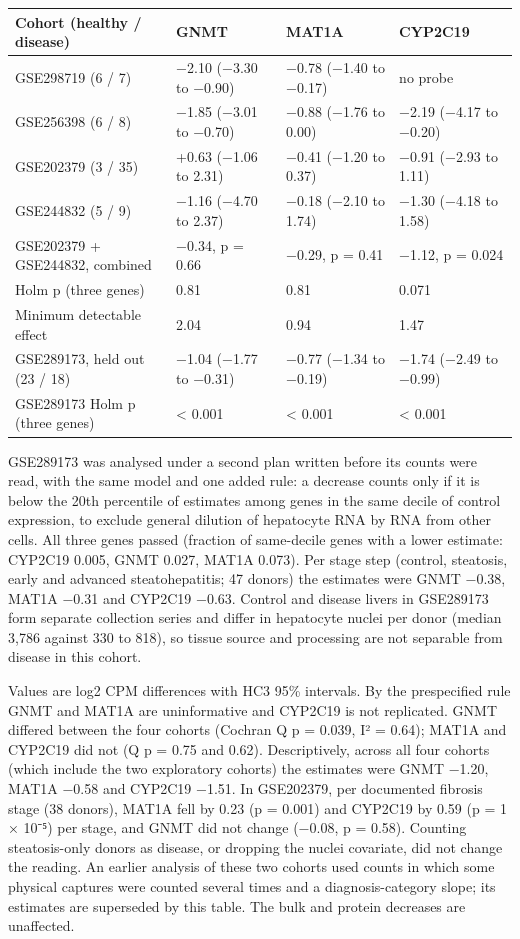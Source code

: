 \begin{longtable}[]{@{}llll@{}}
\toprule\noalign{}
Cohort (healthy / disease) & GNMT & MAT1A & CYP2C19 \\
\midrule\noalign{}
\endhead
\bottomrule\noalign{}
\endlastfoot
GSE298719 (6 / 7) & −2.10 (−3.30 to −0.90) & −0.78 (−1.40 to −0.17) & no probe \\
GSE256398 (6 / 8) & −1.85 (−3.01 to −0.70) & −0.88 (−1.76 to 0.00) & −2.19 (−4.17 to −0.20) \\
GSE202379 (3 / 35) & +0.63 (−1.06 to 2.31) & −0.41 (−1.20 to 0.37) & −0.91 (−2.93 to 1.11) \\
GSE244832 (5 / 9) & −1.16 (−4.70 to 2.37) & −0.18 (−2.10 to 1.74) & −1.30 (−4.18 to 1.58) \\
GSE202379 + GSE244832, combined & −0.34, p = 0.66 & −0.29, p = 0.41 & −1.12, p = 0.024 \\
Holm p (three genes) & 0.81 & 0.81 & 0.071 \\
Minimum detectable effect & 2.04 & 0.94 & 1.47 \\
GSE289173, held out (23 / 18) & −1.04 (−1.77 to −0.31) & −0.77 (−1.34 to −0.19) & −1.74 (−2.49 to −0.99) \\
GSE289173 Holm p (three genes) & \textless{} 0.001 & \textless{} 0.001 & \textless{} 0.001 \\
\end{longtable}

GSE289173 was analysed under a second plan written before its counts were read, with the same model and one added rule: a decrease counts only if it is below the 20th percentile of estimates among genes in the same decile of control expression, to exclude general dilution of hepatocyte RNA by RNA from other cells. All three genes passed (fraction of same-decile genes with a lower estimate: CYP2C19 0.005, GNMT 0.027, MAT1A 0.073). Per stage step (control, steatosis, early and advanced steatohepatitis; 47 donors) the estimates were GNMT −0.38, MAT1A −0.31 and CYP2C19 −0.63. Control and disease livers in GSE289173 form separate collection series and differ in hepatocyte nuclei per donor (median 3,786 against 330 to 818), so tissue source and processing are not separable from disease in this cohort.

Values are log2 CPM differences with HC3 95\% intervals. By the prespecified rule GNMT and MAT1A are uninformative and CYP2C19 is not replicated. GNMT differed between the four cohorts (Cochran Q p = 0.039, I² = 0.64); MAT1A and CYP2C19 did not (Q p = 0.75 and 0.62). Descriptively, across all four cohorts (which include the two exploratory cohorts) the estimates were GNMT −1.20, MAT1A −0.58 and CYP2C19 −1.51. In GSE202379, per documented fibrosis stage (38 donors), MAT1A fell by 0.23 (p = 0.001) and CYP2C19 by 0.59 (p = 1 × 10⁻⁵) per stage, and GNMT did not change (−0.08, p = 0.58). Counting steatosis-only donors as disease, or dropping the nuclei covariate, did not change the reading. An earlier analysis of these two cohorts used counts in which some physical captures were counted several times and a diagnosis-category slope; its estimates are superseded by this table. The bulk and protein decreases are unaffected.

